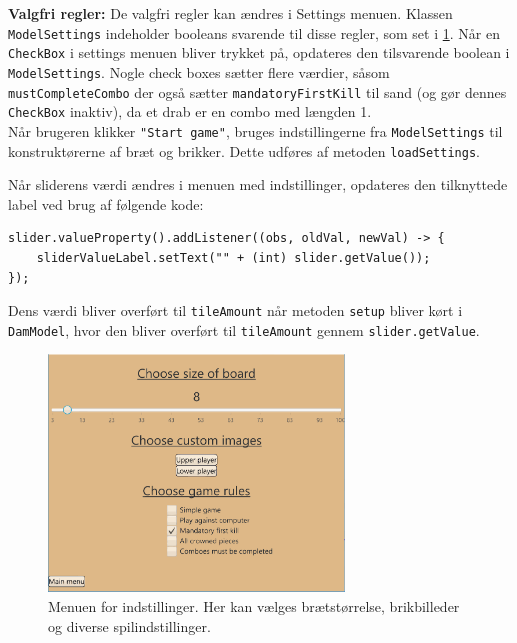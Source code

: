 \textbf{Valgfri regler:} De valgfri regler kan ændres i Settings menuen. Klassen \texttt{ModelSettings} indeholder booleans svarende til disse regler, som set i \ref{fig:settingsMenu}. Når en \texttt{CheckBox} i settings menuen bliver trykket på, opdateres den tilsvarende boolean i \texttt{ModelSettings}. Nogle check boxes sætter flere værdier, såsom \texttt{mustCompleteCombo} der også sætter \texttt{mandatoryFirstKill} til sand (og gør dennes \texttt{CheckBox} inaktiv), da et drab er en combo med længden 1. \\

Når brugeren klikker \texttt{"Start game"}, bruges indstillingerne fra \texttt{ModelSettings} til konstruktørerne af bræt og brikker. Dette udføres af metoden \texttt{loadSettings}. 

Når sliderens værdi ændres i menuen med indstillinger, opdateres den tilknyttede label ved brug af følgende kode:
\begin{lstlisting}
slider.valueProperty().addListener((obs, oldVal, newVal) -> {
    sliderValueLabel.setText("" + (int) slider.getValue());
});
\end{lstlisting}

Dens værdi bliver overført til \texttt{tileAmount} når metoden \texttt{setup} bliver kørt i \texttt{DamModel}, hvor den bliver overført til \texttt{tileAmount} gennem \texttt{slider.getValue}. 

\begin{figure}[H]
\centering
\includegraphics[width = 0.7\textwidth]{Figurer/settingsMenu.pdf}
\caption{Menuen for indstillinger. Her kan vælges brætstørrelse, brikbilleder og diverse spilindstillinger.}
\label{fig:settingsMenu}
\end{figure}